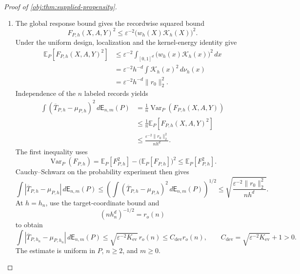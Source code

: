 \begin{proof}[Proof of \cref{obj:thm:supplied-propensity}]
\begin{enumerate}
\item The global response bound gives the recordwise squared bound
\[
F_{P,h}(X,A,Y)^2
\le\varepsilon^{-2}\bigl(w_h(X)\mathcal K_h(X)\bigr)^2.
\]
Under the uniform design, localization and the kernel-energy identity give
\[
\begin{aligned}
\mathbb E_P[F_{P,h}(X,A,Y)^2]
&\le
\varepsilon^{-2}\int_{[0,1]^d}
\bigl(w_h(x)\mathcal K_h(x)\bigr)^2\,dx\\
&=
\varepsilon^{-2}h^{-d}\int\mathcal K_h(x)^2\,d\nu_h(x)\\
&=
\varepsilon^{-2}h^{-d}\|r_0\|_2^2.
\end{aligned}
\]
Independence of the \(n\) labeled records yields
\[
\begin{aligned}
\int(\overline T_{P,h}-\mu_{P,h})^2\,d\mathsf E_{n,m}(P)
&=
\frac1n\operatorname{Var}_P(F_{P,h}(X,A,Y))\\
&\le\frac1n\mathbb E_P[F_{P,h}(X,A,Y)^2]\\
&\le\frac{\varepsilon^{-2}\|r_0\|_2^2}{nh^d}.
\end{aligned}
\]
The first inequality uses
\[
\operatorname{Var}_P(F_{P,h})
=
\mathbb E_P[F_{P,h}^2]
-\bigl(\mathbb E_P[F_{P,h}]\bigr)^2
\le\mathbb E_P[F_{P,h}^2].
\]
Cauchy--Schwarz on the probability experiment then gives
\[
\int|\overline T_{P,h}-\mu_{P,h}|\,d\mathsf E_{n,m}(P)
\le
\left(
\int(\overline T_{P,h}-\mu_{P,h})^2\,d\mathsf E_{n,m}(P)
\right)^{1/2}
\le
\sqrt{\frac{\varepsilon^{-2}\|r_0\|_2^2}{nh^d}}.
\]
At \(h=h_n\), use the target-coordinate bound and
\[
(nh_n^d)^{-1/2}=r_o(n)
\]
to obtain
\[
\int|\overline T_{P,h_n}-\mu_{P,h_n}|\,d\mathsf E_{n,m}(P)
\le\sqrt{\varepsilon^{-2}K_{\mathrm{ev}}}\,r_o(n)
\le C_{\mathrm{dev}}r_o(n),
\qquad
C_{\mathrm{dev}}=\sqrt{\varepsilon^{-2}K_{\mathrm{ev}}}+1>0.
\]
The estimate is uniform in \(P\), \(n\ge2\), and \(m\ge0\).


\end{enumerate}
\end{proof}
